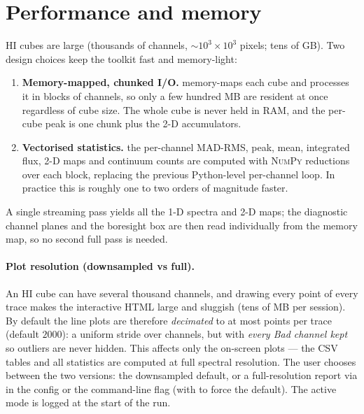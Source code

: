 \documentclass[11pt,a4paper]{article}
\begin{document}
\section{Performance and memory}\label{sec:performance}
HI cubes are large (thousands of channels, $\sim$$10^3\times10^3$ pixels;
tens of GB). Two design choices keep the toolkit fast and memory-light:
\begin{enumerate}[noitemsep,topsep=2pt]
  \item \textbf{Memory-mapped, chunked I/O.}  memory-maps each
        cube and processes it in blocks of  channels, so only
        a few hundred MB are resident at once regardless of cube size. The whole
        cube is never held in RAM, and the per-cube peak is one chunk plus the
        2-D accumulators.
  \item \textbf{Vectorised statistics.} the per-channel MAD-RMS, peak, mean,
        integrated flux, 2-D maps and continuum counts are computed with
        \textsc{NumPy} reductions over each block, replacing the previous
        Python-level per-channel loop. In practice this is roughly one to two
        orders of magnitude faster.
\end{enumerate}
A single streaming pass yields all the 1-D spectra and 2-D maps; the diagnostic
channel planes and the boresight box are then read individually from the memory
map, so no second full pass is needed.

\paragraph{Plot resolution (downsampled vs full).} An HI cube can have several
thousand channels, and drawing every point of every trace makes the interactive
HTML large and sluggish (tens of MB per session). By default the line plots are
therefore \emph{decimated} to at most  points per trace
(default $2000$): a uniform stride over channels, but with \emph{every Bad
channel kept} so outliers are never hidden. This affects only the on-screen
plots --- the CSV tables and all statistics are computed at full spectral
resolution. The user chooses between the two versions: the downsampled default,
or a full-resolution report via  in the config
or the  command-line flag (with  to force
the default). The active mode is logged at the start of the run.
\end{document}
